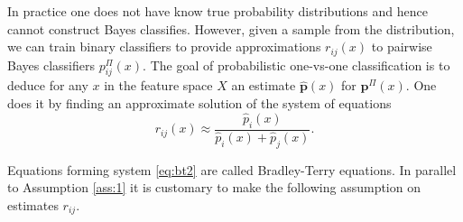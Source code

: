 In practice one does not have know true probability distributions and hence cannot construct Bayes classifies. However, given a sample from the distribution, we can train binary classifiers to provide approximations $r_{ij}(x)$ to pairwise Bayes classifiers $p_{ij}^\Pi(x)$. The goal of probabilistic one-vs-one classification is to deduce for any $x$ in the feature space $X$ an estimate $\hat{\boldsymbol{p}}(x)$ for $\boldsymbol{p}^\Pi(x)$. One does it by finding an approximate solution of the system of equations
%
%
%
%
%
%
%
%
\begin{equation}
	{r}_{ij}(x) \approx \frac {\hat p_i(x)}{\hat p_i(x) + \hat p_j(x)}. \label{eq:bt2}
\end{equation}


Equations forming system \eqref{eq:bt2} are called Bradley-Terry equations. In parallel to Assumption \ref{ass:1} it is customary to make the following assumption on estimates $r_{ij}$.

